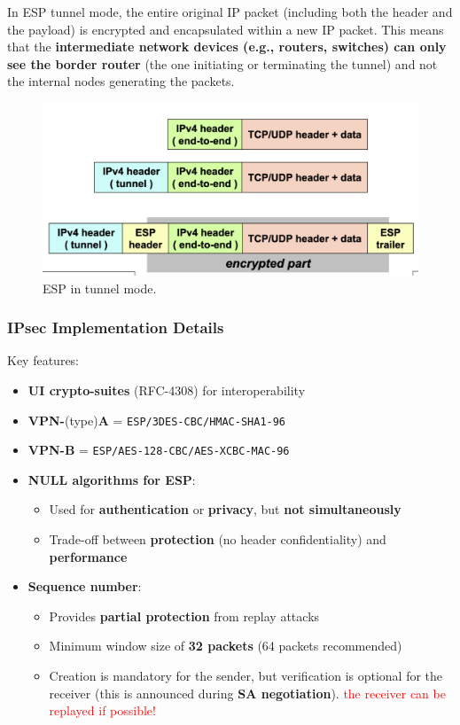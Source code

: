 \begin{tcolorbox}[colback=red!10!white, colframe=red!70!black, coltitle=white, title=Be aware]
    In ESP tunnel mode, the entire original IP packet (including both the header and the payload) is encrypted and encapsulated within a new IP packet. This means that the \textbf{intermediate network devices (e.g., routers, switches) can only see the border router} (the one initiating or terminating the tunnel) and not the internal nodes generating the packets.
\end{tcolorbox}

\begin{figure}[H]
    \includegraphics[width=\linewidth]{Images/NetSec/esp_tunnel_mode.png}
    \caption{ESP in tunnel mode.}
\end{figure}

\subsubsection{IPsec Implementation Details}
Key features:
\begin{itemize}
    \item \textbf{UI crypto-suites} (RFC-4308) for interoperability
    \item \textbf{VPN-}(type)\textbf{A} = \texttt{ESP/3DES-CBC/HMAC-SHA1-96}
    \item \textbf{VPN-B} = \texttt{ESP/AES-128-CBC/AES-XCBC-MAC-96}
    \item \textbf{NULL algorithms for ESP}:
    \begin{itemize}
        \item Used for \textbf{authentication} or \textbf{privacy}, but \textbf{not simultaneously}
        \item Trade-off between \textbf{protection} (no header confidentiality) and \textbf{performance}
    \end{itemize}
    \item \textbf{Sequence number}:
    \begin{itemize}
        \item Provides \textbf{partial protection} from replay attacks
        \item Minimum window size of \textbf{32 packets} (64 packets recommended)
        \item Creation is mandatory for the sender, but verification is optional for the receiver (this is announced during \textbf{SA negotiation}). \textcolor{red}{the receiver can be replayed if possible!}
    \end{itemize}
\end{itemize}

